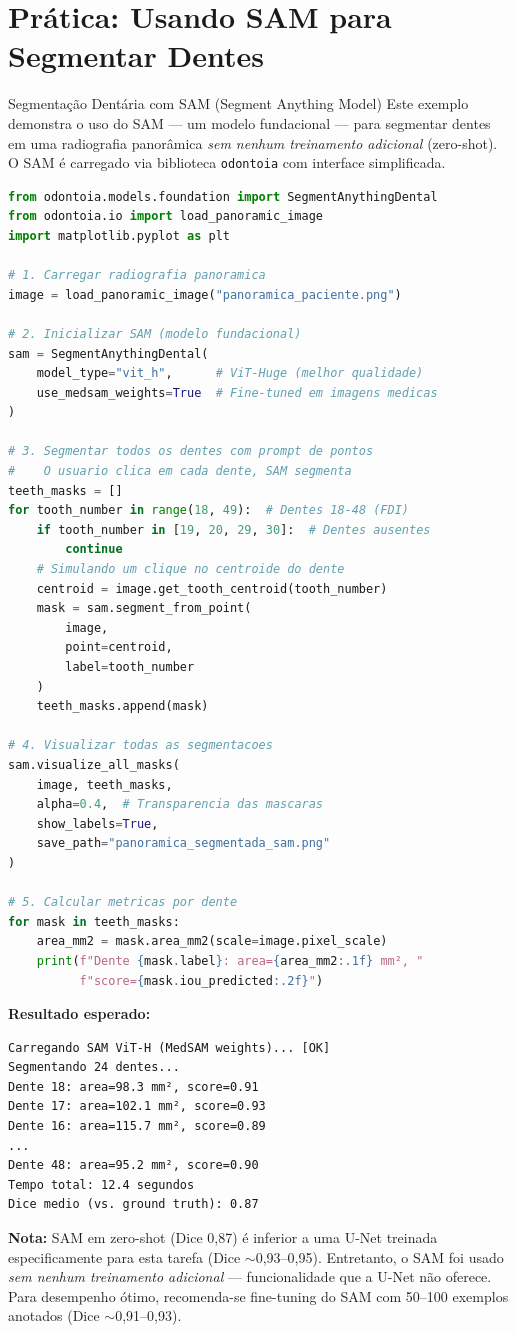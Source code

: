 \section{Prática: Usando SAM para Segmentar Dentes}

\begin{pratica}{Segmentação Dentária com SAM (Segment Anything Model)}
Este exemplo demonstra o uso do SAM --- um modelo fundacional --- para segmentar dentes em uma radiografia panorâmica \textit{sem nenhum treinamento adicional} (zero-shot). O SAM é carregado via biblioteca \texttt{odontoia} com interface simplificada.

\begin{lstlisting}[language=Python, caption={Segmentação dentária zero-shot com SAM}]
from odontoia.models.foundation import SegmentAnythingDental
from odontoia.io import load_panoramic_image
import matplotlib.pyplot as plt

# 1. Carregar radiografia panoramica
image = load_panoramic_image("panoramica_paciente.png")

# 2. Inicializar SAM (modelo fundacional)
sam = SegmentAnythingDental(
    model_type="vit_h",      # ViT-Huge (melhor qualidade)
    use_medsam_weights=True  # Fine-tuned em imagens medicas
)

# 3. Segmentar todos os dentes com prompt de pontos
#    O usuario clica em cada dente, SAM segmenta
teeth_masks = []
for tooth_number in range(18, 49):  # Dentes 18-48 (FDI)
    if tooth_number in [19, 20, 29, 30]:  # Dentes ausentes
        continue
    # Simulando um clique no centroide do dente
    centroid = image.get_tooth_centroid(tooth_number)
    mask = sam.segment_from_point(
        image, 
        point=centroid,
        label=tooth_number
    )
    teeth_masks.append(mask)

# 4. Visualizar todas as segmentacoes
sam.visualize_all_masks(
    image, teeth_masks,
    alpha=0.4,  # Transparencia das mascaras
    show_labels=True,
    save_path="panoramica_segmentada_sam.png"
)

# 5. Calcular metricas por dente
for mask in teeth_masks:
    area_mm2 = mask.area_mm2(scale=image.pixel_scale)
    print(f"Dente {mask.label}: area={area_mm2:.1f} mm², "
          f"score={mask.iou_predicted:.2f}")
\end{lstlisting}

\textbf{Resultado esperado:}
\begin{lstlisting}[style=saida]
Carregando SAM ViT-H (MedSAM weights)... [OK]
Segmentando 24 dentes...
Dente 18: area=98.3 mm², score=0.91
Dente 17: area=102.1 mm², score=0.93
Dente 16: area=115.7 mm², score=0.89
...
Dente 48: area=95.2 mm², score=0.90
Tempo total: 12.4 segundos
Dice medio (vs. ground truth): 0.87
\end{lstlisting}

\textbf{Nota:} SAM em zero-shot (Dice 0,87) é inferior a uma U-Net treinada especificamente para esta tarefa (Dice $\sim$0,93--0,95). Entretanto, o SAM foi usado \textit{sem nenhum treinamento adicional} --- funcionalidade que a U-Net não oferece. Para desempenho ótimo, recomenda-se fine-tuning do SAM com 50--100 exemplos anotados (Dice $\sim$0,91--0,93).
\end{pratica}

